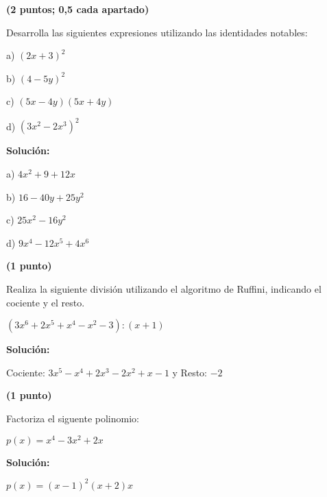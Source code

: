 \documentclass[palatino,noprobframes]{CuartillaSafa}
\renewcommand{\solution}[1]{\textbf{Solución:}
#1
}
\begin{document}
\begin{problem}\textbf{(2 puntos; 0,5 cada apartado)}

Desarrolla las siguientes expresiones utilizando las identidades notables:

a) $(2x+3)^2 $

b) $(4-5y)^2$

c) $(5x-4y)(5x+4y)$

d) $\left(3x^2-2x^3\right)^2$

\solution{
	
a) $4x^2+9+12x$

b) $16-40y+25y^2$

c) $25x^2-16y^2$

d) $9x^4 - 12x^5 + 4x^6$

}
\end{problem}


\begin{problem}\textbf{(1 punto)}

	Realiza la siguiente división utilizando el algoritmo de Ruffini, indicando el cociente y el resto.

	$(3x^6+2x^5+x^4-x^2-3) : (x+1)$

	\solution{

	Cociente: $3x^5-x^4+2x^3-2x^2+x-1$ y Resto: $-2$

}
\end{problem}

\begin{problem}\textbf{(1 punto)}

	Factoriza el siguente polinomio:

	$p(x) = x^4-3x^2+2x$

	\solution{

	$p(x) = (x-1)^2(x+2)x$


}
\end{problem}

\end{document}
